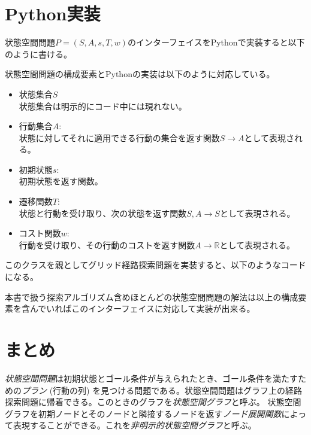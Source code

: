 \section{Python実装}

状態空間問題$P = (S, A, s, T, w)$のインターフェイスをPythonで実装すると以下のように書ける。


状態空間問題の構成要素とPythonの実装は以下のように対応している。

\begin{itemize}
  \item 状態集合$S$ \\
  状態集合は明示的にコード中には現れない。
  \item  行動集合$A$:  \\
  状態に対してそれに適用できる行動の集合を返す関数$S \rightarrow A$として表現される。
  \item 初期状態$s$:  \\
  初期状態を返す関数。
  \item 遷移関数$T$:  \\
  状態と行動を受け取り、次の状態を返す関数$S, A \rightarrow S$として表現される。
  \item コスト関数$w$:  \\
  行動を受け取り、その行動のコストを返す関数$A \rightarrow \mathbb{R}$として表現される。
\end{itemize}

このクラスを親としてグリッド経路探索問題を実装すると、以下のようなコードになる。


本書で扱う探索アルゴリズム含めほとんどの状態空間問題の解法は以上の構成要素を含んでいればこのインターフェイスに対応して実装が出来る。


\section{まとめ}

{\it 状態空間問題}は初期状態とゴール条件が与えられたとき、ゴール条件を満たすための{\it プラン} (行動の列) を見つける問題である。状態空間問題はグラフ上の経路探索問題に帰着できる。このときのグラフを{\it 状態空間グラフ}と呼ぶ。
状態空間グラフを初期ノードとそのノードと隣接するノードを返す{\it ノード展開関数}によって表現することができる。これを{\it 非明示的状態空間グラフ}と呼ぶ。

